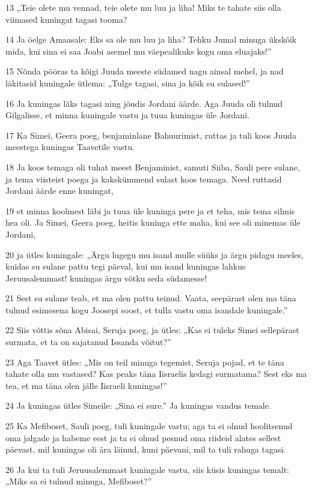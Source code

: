 \par 13 „Teie olete mu vennad, teie olete mu luu ja liha! Miks te tahate siis olla viimased kuningat tagasi tooma?
\par 14 Ja öelge Amaasale: Eks sa ole mu luu ja liha? Tehku Jumal minuga ükskõik mida, kui sina ei saa Joabi asemel mu väepealikuks kogu oma eluajaks!”
\par 15 Nõnda pööras ta kõigi Juuda meeste südamed nagu ainsal mehel, ja nad läkitasid kuningale ütlema: „Tulge tagasi, sina ja kõik su sulased!”
\par 16 Ja kuningas läks tagasi ning jõudis Jordani äärde. Aga Juuda oli tulnud Gilgalisse, et minna kuningale vastu ja tuua kuningas üle Jordani.
\par 17 Ka Simei, Geera poeg, benjaminlane Bahuurimist, ruttas ja tuli koos Juuda meestega kuningas Taavetile vastu.
\par 18 Ja koos temaga oli tuhat meest Benjaminist, samuti Siiba, Sauli pere sulane, ja tema viisteist poega ja kakskümmend sulast koos temaga. Need ruttasid Jordani äärde enne kuningat,
\par 19 et minna koolmest läbi ja tuua üle kuninga pere ja et teha, mis tema silmis hea oli. Ja Simei, Geera poeg, heitis kuninga ette maha, kui see oli minemas üle Jordani,
\par 20 ja ütles kuningale: „Ärgu lugegu mu isand mulle süüks ja ärgu pidagu meeles, kuidas su sulane pattu tegi päeval, kui mu isand kuningas lahkus Jeruusalemmast! kuningas ärgu võtku seda südamesse!
\par 21 Sest su sulane teab, et ma olen pattu teinud. Vaata, seepärast olen ma täna tulnud esimesena kogu Joosepi soost, et tulla vastu oma isandale kuningale.”
\par 22 Siis võttis sõna Abisai, Seruja poeg, ja ütles: „Kas ei tuleks Simei sellepärast surmata, et ta on sajatanud Issanda võitut?”
\par 23 Aga Taavet ütles: „Mis on teil minuga tegemist, Seruja pojad, et te täna tahate olla mu vastased? Kas peaks täna Iisraelis kedagi surmatama? Sest eks ma tea, et ma täna olen jälle Iisraeli kuningas!”
\par 24 Ja kuningas ütles Simeile: „Sina ei sure.” Ja kuningas vandus temale.
\par 25 Ka Mefiboset, Sauli poeg, tuli kuningale vastu; aga ta ei olnud hoolitsenud oma jalgade ja habeme eest ja ta ei olnud pesnud oma riideid alates sellest päevast, mil kuningas oli ära läinud, kuni päevani, mil ta tuli rahuga tagasi.
\par 26 Ja kui ta tuli Jeruusalemmast kuningale vastu, siis küsis kuningas temalt: „Miks sa ei tulnud minuga, Mefiboset?”
